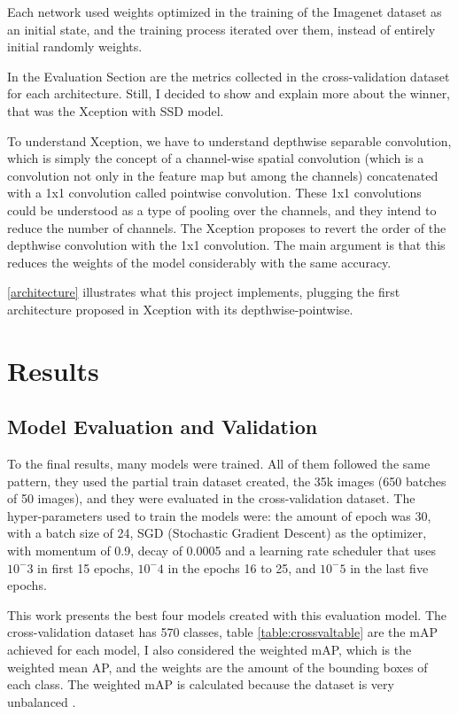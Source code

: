 \documentclass[11pt, a4paper, twocolumn]{article}
\begin{document}
Each network used weights optimized in the training of the Imagenet dataset as an initial state, and the training process iterated over them, instead of entirely initial randomly weights.

In the Evaluation Section are the metrics collected in the cross-validation dataset for each architecture. Still, I decided to show and explain more about the winner, that was the Xception with SSD model.

To understand Xception, we have to understand depthwise separable convolution, which is simply the concept of a channel-wise spatial convolution (which is a convolution not only in the feature map but among the channels) concatenated with a 1x1 convolution called pointwise convolution. These 1x1 convolutions could be understood as a type of pooling over the channels, and they intend to reduce the number of channels. The Xception proposes to revert the order of the depthwise convolution with the 1x1 convolution. The main argument is that this reduces the weights of the model considerably with the same accuracy.

\ref{architecture} illustrates what this project implements, plugging the first architecture proposed in Xception with its depthwise-pointwise.

\section{Results}

\subsection{Model Evaluation and Validation}


To the final results, many models were trained. All of them followed the same pattern, they used the partial train dataset created, the 35k images (650 batches of 50 images), and they were evaluated in the cross-validation dataset. The hyper-parameters used to train the models were: the amount of epoch was 30, with a batch size of 24, SGD (Stochastic Gradient Descent) as the optimizer, with momentum of 0.9, decay of 0.0005 and a learning rate scheduler that uses $10^-3$ in first 15 epochs, $10^-4$ in the epochs 16 to 25, and $10^-5$ in the last five epochs.

This work presents the best four models created with this evaluation model. The cross-validation dataset has 570 classes, table \ref{table:crossvaltable} are the mAP achieved for each model, I also considered the weighted mAP, which is the weighted mean AP, and the weights are the amount of the bounding boxes of each class. The weighted mAP is calculated because the dataset is very unbalanced \cite{modeleval}.
\end{document}
